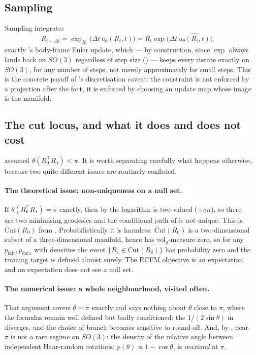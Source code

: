 \documentclass[11pt,a4paper]{report}
\theoremstyle{definition}
\theoremstyle{remark}
\begin{document}
\subsection{Sampling}

Sampling integrates
\begin{equation}
\label{eq:so3-flow-euler-scratch}
R_{t+\Delta t} = \exp_{R_t}\bigl(\Delta t\,u_\theta(R_t,t)\bigr) = R_t\exp\bigl(\Delta t\,\widehat{u_\theta(R_t,t)}\bigr) ,
\end{equation}
exactly 's body-frame Euler update,
which --- by construction, since $\exp$ always lands back on $SO(3)$
regardless of step size () --- keeps every
iterate exactly on $SO(3)$, for any number of steps, not merely
approximately for small steps. This is the concrete payoff of
's discretisation caveat: the constraint is not
enforced by a projection after the fact, it is enforced by choosing an
update map whose image is the manifold.

\subsection{The cut locus, and what it does and does not cost}
\label{sec:rfm-so3-cut-locus}

 assumed $\theta(R_0^\top R_1)<\pi$. It is worth
separating carefully what happens otherwise, because two quite different
issues are routinely conflated.

\paragraph{The theoretical issue: non-uniqueness on a null set.} If
$\theta(R_0^\top R_1)=\pi$ exactly, then by  the
logarithm is two-valued ($\pm\pi n$), so there are two minimising geodesics
and the conditional path of  is not unique. This
is $\mathrm{Cut}(R_0)$ from . Probabilistically it
is harmless: $\mathrm{Cut}(R_0)$ is a two-dimensional subset of a
three-dimensional manifold, hence has $\mathrm{vol}_g$-measure zero, so for
any $p_{\mathrm{init}},p_{\mathrm{data}}$ with densities the event
$\{R_1\in\mathrm{Cut}(R_0)\}$ has probability zero and the training target
is defined almost surely. The RCFM objective is an expectation, and an
expectation does not see a null set.

\paragraph{The numerical issue: a whole neighbourhood, visited often.} That
argument covers $\theta=\pi$ exactly and says nothing about $\theta$ close
to $\pi$, where the formulas remain well defined but badly conditioned: the
$1/(2\sin\theta)$ in  diverges, and the choice of
branch becomes sensitive to round-off. And, by
, near-$\pi$ is not a rare regime on
$SO(3)$: the density of the relative angle between independent Haar-random
rotations, $p(\theta)\propto1-\cos\theta$, is \emph{maximal} at $\pi$.
\end{document}
